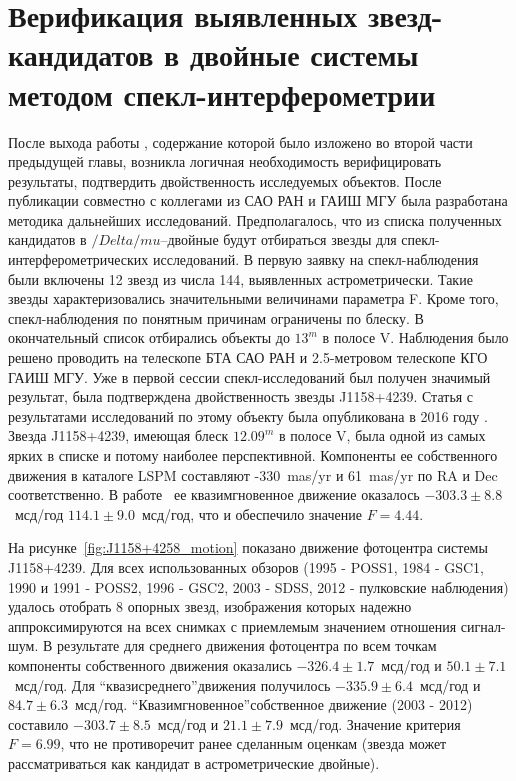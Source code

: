 \chapter{Верификация выявленных звезд-кандидатов в двойные системы методом спекл-интерферометрии} \label{ch:ch5}
После выхода работы , содержание которой было изложено во второй части предыдущей главы, возникла логичная необходимость верифицировать результаты, подтвердить двойственность исследуемых объектов. После публикации совместно с коллегами из САО РАН и ГАИШ МГУ была разработана методика дальнейших исследований. Предполагалось, что из списка полученных кандидатов в $/Delta/mu$--двойные будут отбираться звезды для спекл-интерферометрических исследований.
В первую заявку на спекл-наблюдения были включены 12 звезд из числа 144, выявленных астрометрически. Такие звезды характеризовались значительными величинами параметра F. Кроме того, спекл-наблюдения по понятным причинам ограничены по блеску. В окончательный список отбирались объекты до $13^m$ в полосе V.
 Наблюдения было решено проводить на телескопе БТА САО РАН и 2.5-метровом телескопе КГО ГАИШ МГУ. Уже в первой сессии спекл-исследований был получен  значимый результат, была подтверждена двойственность звезды J1158+4239. Статья с результатами исследований по этому объекту была опубликована в 2016 году .
Звезда J1158+4239, имеющая блеск $12.09^m$ в полосе V, была одной из самых ярких в списке и потому наиболее перспективной. Компоненты ее собственного движения в каталоге LSPM составляют -330~mas/yr и 61~mas/yr по RA и Dec соответственно. В работе~%
ее квазимгновенное движение оказалось  $-303.3\pm 8.8$~мсд/год   $114.1\pm9.0$~мсд/год, что и обеспечило значение $F = 4.44$.

На рисунке~\ref{fig:J1158+4258_motion} показано движение фотоцентра системы J1158+4239. Для всех использованных обзоров (1995 - POSS1, 1984 - GSC1, 1990 и 1991 - POSS2, 1996 - GSC2, 2003 - SDSS, 2012 - пулковские наблюдения) удалось отобрать 8 опорных звезд, изображения которых надежно аппроксимируются на всех снимках с приемлемым значением отношения сигнал-шум. В результате для среднего движения фотоцентра по всем точкам компоненты собственного движения оказались $-326.4\pm1.7$~мсд/год    и   $50.1\pm7.1$~мсд/год. Для \textquotedblleft квазисреднего\textquotedblright движения получилось $-335.9\pm6.4$~мсд/год    и   $84.7\pm6.3$~мсд/год. \textquotedblleft Квазимгновенное\textquotedblright собственное движение (2003 - 2012) составило $-303.7\pm8.5$~мсд/год    и   $21.1\pm7.9$~мсд/год. Значение критерия $F = 6.99$, что не противоречит ранее сделанным оценкам (звезда может рассматриваться как кандидат в астрометрические двойные).

